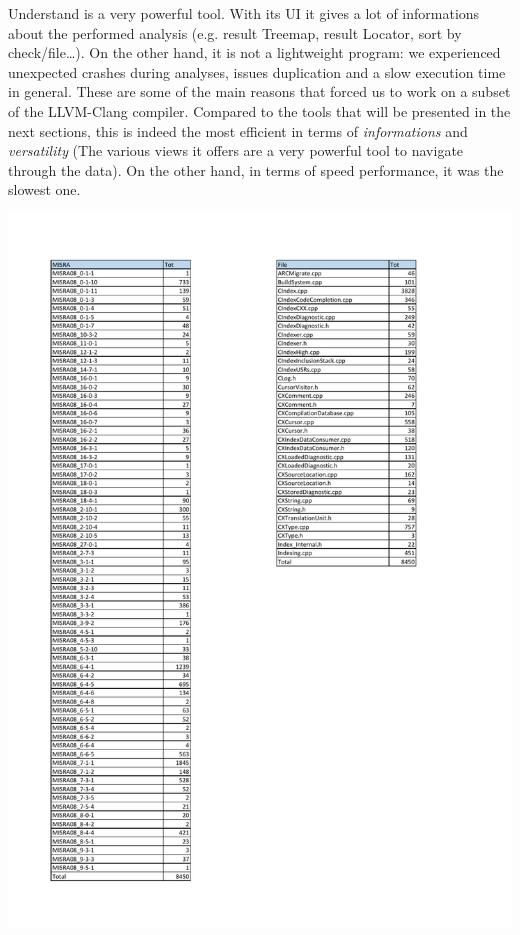 Understand is a very powerful tool. With its UI it gives a lot of informations about the performed analysis (e.g. result Treemap, result Locator, sort by check/file\dots).
On the other hand, it is not a lightweight program: we experienced unexpected crashes during analyses, issues duplication and a slow execution time in general. These are some of the main reasons that forced us to work on a subset of the LLVM-Clang compiler.\newline
Compared to the tools that will be presented in the next sections, this is indeed the most efficient in terms of \textsl{informations} and \textsl{versatility} (The various views it offers are a very powerful tool to navigate through the data). On the other hand, in terms of speed performance, it was the slowest one.

\pagebreak

\begin{minipage}{\linewidth}
	\includegraphics[width=\textwidth]{pdf/Misra_Summary.pdf}
\end{minipage}

